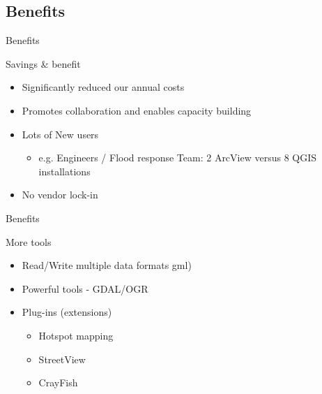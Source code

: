 \subsection{Benefits}

\begin{frame}{Benefits}
	\begin{block}{Savings \& benefit}
		\begin{itemize}
			\item Significantly reduced our annual costs 
			\item Promotes collaboration and enables capacity building 
			
			\item Lots of New users
				\begin{itemize}
					\item e.g. Engineers / Flood response Team: 2 ArcView versus 8 QGIS installations
					
				\end{itemize}
						
			\item No vendor lock-in
						
		\end{itemize}
	\end{block}
\end{frame}

\begin{frame}{Benefits}
	\begin{block}{More tools}
		\begin{itemize}
			\item Read/Write multiple data formats gml)
			 \item Powerful tools - GDAL/OGR
			\item Plug-ins (extensions)
			\begin{itemize}
				\item Hotspot mapping
				
				\item StreetView
				
				\item CrayFish
			\end{itemize}		

						
		\end{itemize}
	\end{block}
\end{frame}

